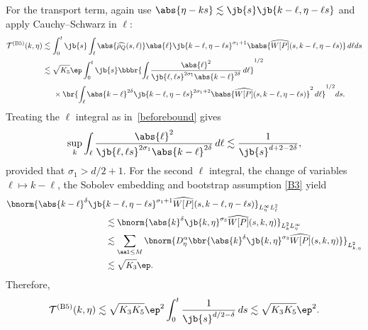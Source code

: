 For the transport term, again use $\abs{\eta-ks} \lesssim \jb{s} \jb{k-\ell,\eta-\ell s}$ and apply Cauchy--Schwarz in $\ell$:
\begin{align*}
\mathcal{T}^{\mathrm{(B5)}}(k,\eta)&\lesssim\int_0^t\jb{s}\int_\ell \abs{\widehat{\rho_Q}(s,\ell )}\abs{\ell}\jb{k-\ell,\eta-\ell s}^{\sigma_1+1}\babs{\widehat{W[P]}(s,k-\ell ,\eta-\ell s)}\,d\ell ds\\
&\lesssim\sqrt{K_5}\ep\int_0^t\jb{s}\bbbr{\int_\ell\frac{\abs{\ell}^2}{\jb{\ell,\ell s}^{2\sigma_1}\abs{k-\ell}^{2\delta}}\,d\ell}^{1/2}\\
&\hspace{0.5cm}\times\br{\int_\ell \abs{k-\ell}^{2\delta}\jb{k-\ell,\eta-\ell s}^{2\sigma_1+2}\babs{\widehat{W[P]}(s,k-\ell ,\eta-\ell s)}^2\,d\ell}^{1/2} ds.
\end{align*}
Treating the $\ell$ integral as in~\eqref{beforebound} gives
\begin{align*}
\sup_{k}\int_\ell\frac{\abs{\ell}^2}{\jb{\ell,\ell s}^{2\sigma_1}\abs{k-\ell}^{2\delta}}\,d\ell\lesssim\frac{1}{\jb{s}^{d+2-2\delta}},
\end{align*}
provided that $\sigma_1>d/2+1$. For the second $\ell$ integral, the change of variables $\ell\mapsto k-\ell$, the Sobolev embedding and bootstrap assumption \eqref{B3} yield
\begin{align*}
&\bnorm{\abs{k-\ell}^{\delta}\jb{k-\ell,\eta-\ell s}^{\sigma_1+1}\widehat{W[P]}(s,k-\ell,\eta-\ell s)}_{L^\infty_\eta L^2_\ell}\\
&\hspace{4cm}\lesssim\bnorm{\abs{k}^{\delta}\jb{k,\eta}^{\sigma_3}\widehat{W[P]}(s,k,\eta)}_{L^2_k L^\infty_\eta}\\
&\hspace{4cm}\lesssim\sum_{\aal\leq M}\bnorm{D^\alpha_\eta\bbr{\abs{k}^{\delta}\jb{k,\eta}^{\sigma_3}\widehat{W[P]}(s,k,\eta)}}_{L^2_{k,\eta}}\\
&\hspace{4cm}\lesssim\sqrt{K_3}\ep.
\end{align*}
Therefore,
\begin{align*}
\mathcal{T}^{\mathrm{(B5)}}(k,\eta)\lesssim\sqrt{K_3K_5}\ep^2\int_0^t\frac{1}{\jb{s}^{{d/2}-\delta}}\,ds\lesssim\sqrt{K_3K_5}\ep^2.
\end{align*}

